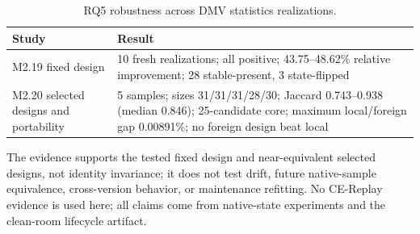 \begin{table}[t]
\caption{RQ5 robustness across DMV statistics realizations.}
\label{tab:rq5}
\tiny
\begin{tabular}{@{}p{}p{}@{}}
\toprule
Study & Result \\
\midrule
M2.19 fixed design & 10 fresh realizations; all positive; 43.75--48.62\% relative improvement; 28 stable-present, 3 state-flipped \\
M2.20 selected designs and portability & 5 samples; sizes 31/31/31/28/30; Jaccard 0.743--0.938 (median 0.846); 25-candidate core; maximum local/foreign gap 0.00891\%; no foreign design beat local \\
\bottomrule
\end{tabular}
\end{table}

The evidence supports the tested fixed design and near-equivalent selected
designs, not identity invariance; it does not test drift, future native-sample
equivalence, cross-version behavior, or maintenance refitting.  No CE-Replay
evidence is used here; all claims come from native-state experiments and the
clean-room lifecycle artifact.
\vspace{-8pt}
